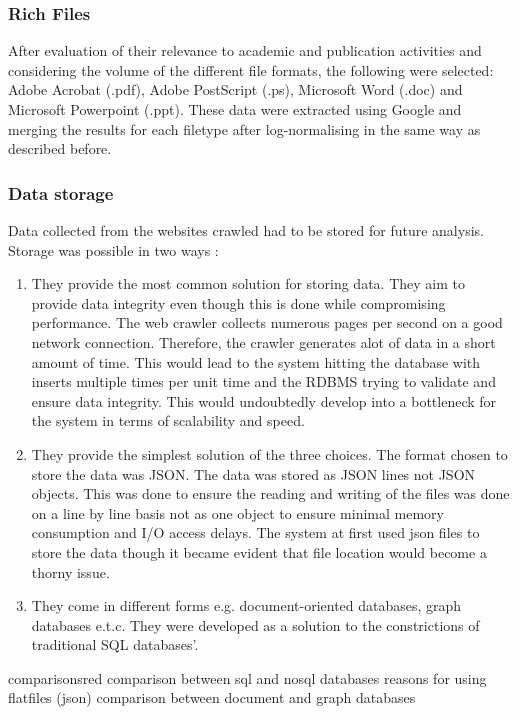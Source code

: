 \subsubsection{Rich Files}
After evaluation of their relevance to academic and publication activities and considering the volume of the different file formats, the following were selected: Adobe Acrobat (.pdf), Adobe PostScript (.ps), Microsoft Word (.doc) and Microsoft Powerpoint (.ppt). These data were extracted using Google and merging the results for each filetype after log-normalising in the same way as described before.
\subsubsection{Data storage}
Data collected from the websites crawled had to be stored for future analysis. Storage was possible in two ways : 
\begin{enumerate}
\item {}
They provide the most common solution for storing data. They aim to provide data integrity even though this is done while compromising performance. The web crawler collects numerous pages per second on a good network connection. Therefore, the crawler generates alot of data in a short amount of time. This would lead to the system hitting the database with inserts multiple times per unit time and the RDBMS trying to validate and ensure data integrity. This would undoubtedly develop into a bottleneck for the system in terms of scalability and speed.

\item {}
They provide the simplest solution of the three choices. The format chosen to store the data was JSON. The data was stored as JSON lines not JSON objects. This was done to ensure the reading and writing of the files was done on a line by line basis not as one object to ensure minimal memory consumption and I/O access delays. The system at first used json files to store the data though it became evident that file location would become a thorny issue. 

\item {}
They come in different forms e.g. document-oriented databases, graph databases e.t.c. They were developed as a solution to the constrictions of traditional SQL databases'.

\end{enumerate}
\begin{review_comment}{comparisons}{red}
{
    comparison between sql and nosql databases
    reasons for using flatfiles (json)
    comparison between document and graph databases
}
\end{review_comment}